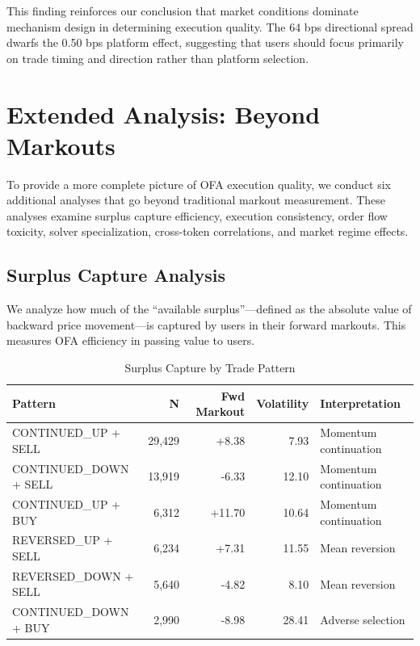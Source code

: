 \documentclass[12pt,a4paper]{article}
\begin{document}
This finding reinforces our conclusion that market conditions dominate mechanism design in determining execution quality. The 64 bps directional spread dwarfs the 0.50 bps platform effect, suggesting that users should focus primarily on trade timing and direction rather than platform selection.

\section{Extended Analysis: Beyond Markouts}

To provide a more complete picture of OFA execution quality, we conduct six additional analyses that go beyond traditional markout measurement. These analyses examine surplus capture efficiency, execution consistency, order flow toxicity, solver specialization, cross-token correlations, and market regime effects.

\subsection{Surplus Capture Analysis}

We analyze how much of the ``available surplus''---defined as the absolute value of backward price movement---is captured by users in their forward markouts. This measures OFA efficiency in passing value to users.

\begin{table}[H]
\centering
\caption{Surplus Capture by Trade Pattern}
\label{tab:surplus}
\begin{tabular}{lrrrp{3cm}}
\toprule
\textbf{Pattern} & \textbf{N} & \textbf{Fwd Markout} & \textbf{Volatility} & \textbf{Interpretation} \\
\midrule
CONTINUED\_UP + SELL & 29,429 & +8.38 & 7.93 & Momentum continuation \\
CONTINUED\_DOWN + SELL & 13,919 & -6.33 & 12.10 & Momentum continuation \\
CONTINUED\_UP + BUY & 6,312 & +11.70 & 10.64 & Momentum continuation \\
REVERSED\_UP + SELL & 6,234 & +7.31 & 11.55 & Mean reversion \\
REVERSED\_DOWN + SELL & 5,640 & -4.82 & 8.10 & Mean reversion \\
CONTINUED\_DOWN + BUY & 2,990 & -8.98 & 28.41 & Adverse selection \\
\bottomrule
\end{tabular}
\end{table}
\end{document}

